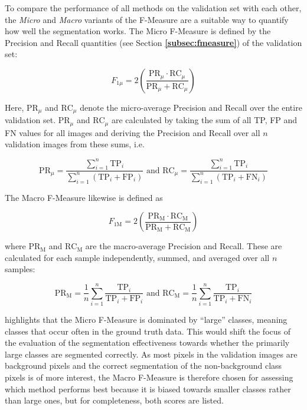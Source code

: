 \noindent To compare the performance of all methods on the validation set with each other, the \textit{Micro} and \textit{Macro} variants of the F-Measure \cite{micromacro} are a suitable way to quantify how well the segmentation works. The Micro F-Measure is defined by the Precision and Recall quantities (see Section \textbf{\ref{subsec:fmeasure}}) of the validation set:

\[ F_{1\mu} = 2 \left ( \frac{\text{PR}_\mu \cdot \text{RC}_\mu}{\text{PR}_\mu + \text{RC}_\mu} \right ) \]

\noindent Here, $\text{PR}_\mu$ and $\text{RC}_\mu$ denote the micro-average Precision and Recall over the entire validation set. $\text{PR}_\mu$ and $\text{RC}_\mu$ are calculated by taking the sum of all TP, FP and FN values for all images and deriving the Precision and Recall over all $n$ validation images from these sums, i.e.

\[ \text{PR}_\mu = \frac{\sum_{i=1}^{n}\text{TP}_i}{\sum_{i=1}^{n} (\text{TP}_i + \text{FP}_i)} \text{ and }  \text{RC}_\mu = \frac{\sum_{i=1}^{n} \text{TP}_i}{\sum_{i=1}^{n} (\text{TP}_i + \text{FN}_i)} \]

\noindent The Macro F-Measure likewise is defined as

\[ F_{\text{1M}} = 2 \left ( \frac{\text{PR}_\text{M} \cdot \text{RC}_\text{M}}{\text{PR}_\text{M} + \text{RC}_\text{M}} \right ) \]

\noindent where $\text{PR}_\text{M}$ and $\text{RC}_\text{M}$ are the macro-average Precision and Recall. These are calculated for each sample independently, summed, and averaged over all $n$ samples:

\[ \text{PR}_\text{M} = \frac{1}{n} \sum_{i=1}^{n} \frac{\text{TP}_i}{\text{TP}_i + \text{FP}_i} \text { and } \text{RC}_\text{M} = \frac{1}{n} \sum_{i=1}^{n} \frac{\text{TP}_i}{\text{TP}_i + \text{FN}_i} \] 

\noindent \cite[pp. 317-318]{information_retrieval} highlights that the Micro F-Measure is dominated by ``large'' classes, meaning classes that occur often in the ground truth data. This would shift the focus of the evaluation of the segmentation effectiveness towards whether the primarily large classes are segmented correctly. As most pixels in the validation images are background pixels and the correct segmentation of the non-background class pixels is of more interest, the Macro F-Measure is therefore chosen for assessing which method performs best because it is biased towards smaller classes rather than large ones, but for completeness, both scores are listed.\\

